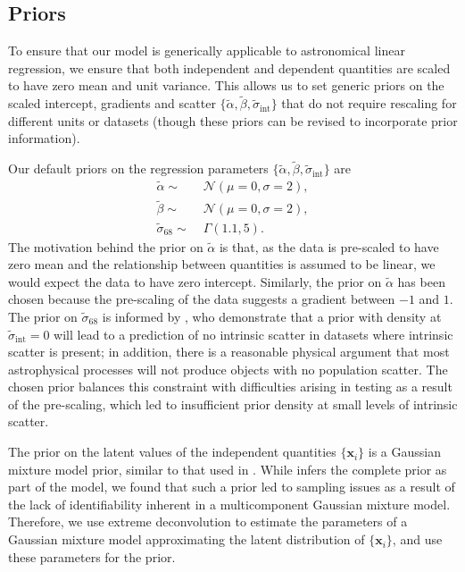 \documentclass[fleqn,usenatbib]{rasti}
\newcommand{\indepvars}{\boldsymbol{x}_i}
\newcommand{\intercept}{\alpha}
\newcommand{\covariate}{\beta}
\begin{document}
\subsection{Priors}
\label{sec:formalism.prior}

To ensure that our model is generically applicable to astronomical linear
regression, we ensure that both independent and dependent quantities are scaled
to have zero mean and unit variance. This allows us to set generic priors on the
scaled intercept, gradients and scatter $\{\tilde{\intercept},
\tilde{\covariate}, \tilde{\sigma}_{\text{int}}\}$ that do not require rescaling for
different units or datasets (though these priors can be revised to incorporate
prior information).

Our default priors on the regression parameters $\{\tilde{\intercept},
\tilde{\covariate}, \tilde{\sigma}_{\text{int}}\}$ are
\begin{align}
    \tilde{\intercept} \sim&\; \mathcal N(\mu = 0, \sigma = 2), \\
    \tilde{\covariate} \sim&\; \mathcal N(\mu = 0, \sigma = 2), \\
    \tilde{\sigma}_{68} \sim&\; \Gamma(1.1, 5).
\end{align}
The motivation behind the prior on $\tilde{\intercept}$ is that, as the data is
pre-scaled to have zero mean and the relationship between quantities is assumed
to be linear, we would expect the data to have zero intercept. Similarly, the
prior on $\tilde{\alpha}$ has been chosen because the pre-scaling of the data
suggests a gradient between $-1$ and $1$. The prior on $\tilde{\sigma}_{68}$ is
informed by \citet{Chung:2013}, who demonstrate that a prior with density at
$\tilde{\sigma}_{\text{int}} = 0$ will lead to a prediction of no intrinsic
scatter in datasets where intrinsic scatter is present; in addition, there is a
reasonable physical argument that most astrophysical processes will not produce
objects with no population scatter. The chosen prior balances this constraint
with difficulties arising in testing as a result of the pre-scaling, which led
to insufficient prior density at small levels of intrinsic scatter.

The prior on the latent values of the independent quantities $\{\indepvars\}$ is
a Gaussian mixture model prior, similar to that used in \citet{Kelly:2007}.
While \citeauthor{Kelly:2007} infers the complete prior as part of the model, we
found that such a prior led to sampling issues as a result of the lack of
identifiability inherent in a multicomponent Gaussian mixture model. Therefore,
we use extreme deconvolution \citep{Bovy:2011} to estimate the parameters of a
Gaussian mixture model approximating the latent distribution of
$\{\indepvars\}$, and use these parameters for the prior.
\end{document}
